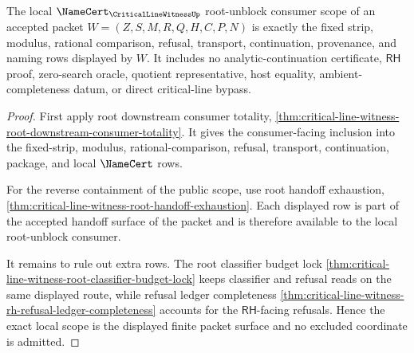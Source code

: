 \begin{theorem}
\label{thm:critical-line-witness-namecert-root-unblock-consumer-scope}
The local $\NameCert_{\CriticalLineWitnessUp}$ root-unblock consumer scope of
an accepted packet $W=(Z,S,M,R,Q,H,C,P,N)$ is exactly the fixed strip, modulus,
rational comparison, refusal, transport, continuation, provenance, and naming
rows displayed by $W$. It includes no analytic-continuation certificate,
$\mathsf{RH}$ proof, zero-search oracle, quotient representative, host
equality, ambient-completeness datum, or direct critical-line bypass.
\end{theorem}
\begin{proof}
First apply root downstream consumer totality,
\autoref{thm:critical-line-witness-root-downstream-consumer-totality}. It gives
the consumer-facing inclusion into the fixed-strip, modulus,
rational-comparison, refusal, transport, continuation, package, and local
$\NameCert$ rows.

For the reverse containment of the public scope, use root handoff exhaustion,
\autoref{thm:critical-line-witness-root-handoff-exhaustion}. Each displayed row
is part of the accepted handoff surface of the packet and is therefore
available to the local root-unblock consumer.

It remains to rule out extra rows. The root classifier budget lock
\autoref{thm:critical-line-witness-root-classifier-budget-lock} keeps
classifier and refusal reads on the same displayed route, while refusal ledger
completeness
\autoref{thm:critical-line-witness-rh-refusal-ledger-completeness} accounts for
the $\mathsf{RH}$-facing refusals. Hence the exact local scope is the displayed
finite packet surface and no excluded coordinate is admitted.
\end{proof}
